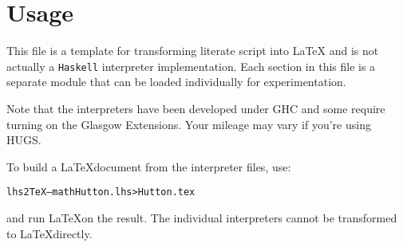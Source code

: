\documentclass[10pt]{article}
\begin{document}
\section{Usage}

This file is a template for transforming literate script into \LaTeX
and is not actually a \texttt{Haskell} interpreter implementation.
Each section in this file is a separate module that can be loaded
individually for experimentation.


Note that the interpreters have been developed under GHC and some
require turning on the Glasgow Extensions.  Your mileage may vary if
you're using HUGS.

To build a \LaTeX document from the interpreter files, use:

\begin{alltt}
   lhs2TeX --math Hutton.lhs > Hutton.tex
\end{alltt}

and run \LaTeX on the result.  The individual interpreters cannot be
transformed to \LaTeX directly.
\end{document}
